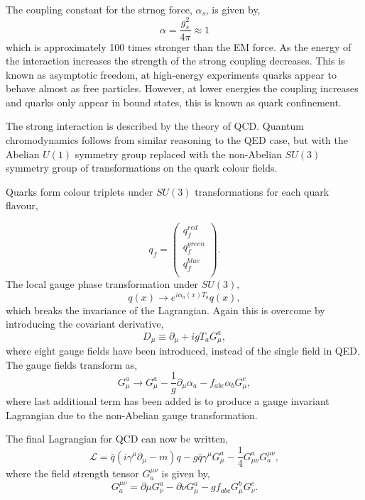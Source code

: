 The coupling constant for the strnog force, $\alpha_s$, is given by,
\begin{equation}
\alpha = \frac{g_s^2}{4 \pi} \approx 1
\end{equation}
which is approximately 100 times stronger than the {EM} force.
As the energy of the interaction increases the strength of the strong coupling
decreases. This is known as asymptotic freedom, at high-energy experiments
quarks appear to behave almost as free particles. However, at lower energies 
the coupling increases and quarks only appear in bound states, this is known as
quark confinement.

The strong interaction is described by the theory of {QCD}.
Quantum chromodynamics follows from similar reasoning to the {QED} case, but with
the Abelian $U(1)$ symmetry group replaced with the non-Abelian $SU(3)$ symmetry
group of transformations on the quark colour fields.

Quarks form colour triplets under $SU(3)$ transformations for each quark
flavour,

\begin{equation}
q_{f} =
\left(\begin{matrix} 
q^{red}_{f} \\
q^{green}_{f} \\
q^{blue}_{f} \\
\end{matrix} \right).
\end{equation}
The local gauge phase transformation under $SU(3)$,
\begin{equation}
q(x) \to e^{i\alpha_a(x)T_a} q(x),
\end{equation}
which breaks the invariance of the Lagrangian. Again this is overcome by
introducing the covariant derivative,
\begin{equation}
D_{\mu} \equiv \partial_{\mu} + i g T_{a} G_{\mu}^{a},
\end{equation}
where eight gauge fields have been introduced, instead of the single field in
QED.  
The gauge fields transform as,
\begin{equation}
 G_{\mu}^{a} \to G_{\mu}^{a} 
-\frac{1}{g}\partial_{\mu}\alpha_{a}
-f_{abc}\alpha_{b}G^{c}_{\mu},
\end{equation}
where last additional term has been added is to produce a gauge invariant
Lagrangian due to the non-Abelian gauge transformation.

The final Lagrangian for QCD can now be written,
\begin{equation}
\mathcal{L} = 
\bar{q}(i\gamma^{\mu}\partial_{\mu} - m)q -
g \bar{q} \gamma^{\mu} G_{\mu}^{a} - 
\frac{1}{4} G_{\mu\nu}^{a} G^{\mu\nu}_{a},
\end{equation}
where the field strength tensor $G^{\mu\nu}_{a}$ is given by,
\begin{equation}
G^{\mu\nu}_{a} 
= \partial{\mu} G^{a}_{\nu}
- \partial{\nu} G^{a}_{\mu}
-g f_{abc} G^{b}_{\mu} G^{c}_{\nu}.
\end{equation}

